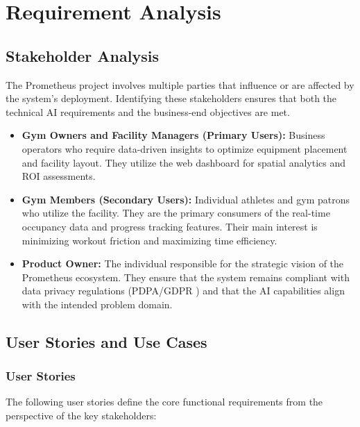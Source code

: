 \chapter{Requirement Analysis}
\label{chap:requirement-analysis}

\section{Stakeholder Analysis}
\label{section:stakeholder-analysis}

The Prometheus project involves multiple parties that influence or are affected by the system's deployment. Identifying these stakeholders ensures that both the technical AI requirements and the business-end objectives are met.

\begin{itemize}
    \item \textbf{Gym Owners and Facility Managers (Primary Users):} Business operators who require data-driven insights to optimize equipment placement and facility layout. They utilize the web dashboard for spatial analytics and ROI assessments.
    \item \textbf{Gym Members (Secondary Users):} Individual athletes and gym patrons who utilize the facility. They are the primary consumers of the real-time occupancy data and progress tracking features. Their main interest is minimizing workout friction and maximizing time efficiency.
    \item \textbf{Product Owner:} The individual responsible for the strategic vision of the Prometheus ecosystem. They ensure that the system remains compliant with data privacy regulations (PDPA/GDPR \cite{thailand:pdpa}) and that the AI capabilities align with the intended problem domain.
\end{itemize}

\section{User Stories and Use Cases}
\label{section:user-stories-use-cases}

\subsection{User Stories}
The following user stories define the core functional requirements from the perspective of the key stakeholders:

